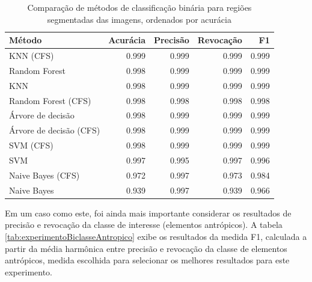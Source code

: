 \begin{table}[h]
\centering
	\begin{tabulary}{\linewidth}{|L|R|R|R|R|}
		\hline
		\textbf{Método} & \textbf{Acurácia} & \textbf{Precisão} & \textbf{Revocação} & \textbf{F1} \\ \hline
		KNN (CFS)               & 0.999 & 0.999 & 0.999 & 0.999 \\ \hline
		Random Forest           & 0.998 & 0.999 & 0.999 & 0.999 \\ \hline
		KNN                     & 0.998 & 0.999 & 0.999 & 0.999 \\ \hline
		Random Forest (CFS)     & 0.998 & 0.998 & 0.998 & 0.998 \\ \hline
		Árvore de decisão       & 0.998 & 0.999 & 0.999 & 0.999 \\ \hline
		Árvore de decisão (CFS) & 0.998 & 0.999 & 0.999 & 0.999 \\ \hline
		SVM (CFS)               & 0.998 & 0.999 & 0.999 & 0.999 \\ \hline
		SVM                     & 0.997 & 0.995 & 0.997 & 0.996 \\ \hline
		Naive Bayes (CFS)       & 0.972 & 0.997 & 0.973 & 0.984 \\ \hline
		Naive Bayes             & 0.939 & 0.997 & 0.939 & 0.966 \\ \hline
	\end{tabulary}
\caption{Comparação de métodos de classificação binária para regiões segmentadas das imagens, ordenados por acurácia}
\label{tab:experimentoBiclasse}
\end{table}

Em um caso como este, foi ainda mais importante considerar os resultados de precisão e revocação da classe de interesse (elementos antrópicos). A tabela \ref{tab:experimentoBiclasseAntropico} exibe os resultados da medida F1, calculada a partir da média harmônica entre precisão e revocação da classe de elementos antrópicos, medida escolhida para selecionar os melhores resultados para este experimento.


